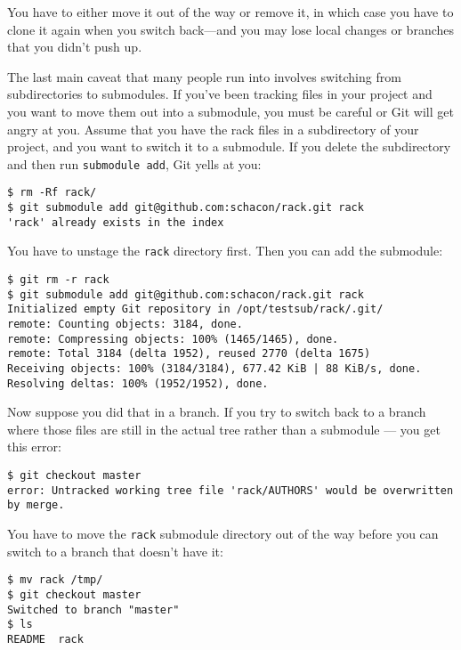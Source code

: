 \documentclass[a4paper]{book}
\begin{document}
You have to either move it out of the way or remove it, in which case you have to clone it again when you switch back---and you may lose local changes or branches that you didn't push up.

The last main caveat that many people run into involves switching from subdirectories to submodules. If you've been tracking files in your project and you want to move them out into a submodule, you must be careful or Git will get angry at you. Assume that you have the rack files in a subdirectory of your project, and you want to switch it to a submodule. If you delete the subdirectory and then run \texttt{submodule add}, Git yells at you:

\begin{shaded}\begin{verbatim}
$ rm -Rf rack/
$ git submodule add git@github.com:schacon/rack.git rack
'rack' already exists in the index
\end{verbatim}\end{shaded}

You have to unstage the \texttt{rack} directory first. Then you can add the submodule:

\begin{shaded}\begin{verbatim}
$ git rm -r rack
$ git submodule add git@github.com:schacon/rack.git rack
Initialized empty Git repository in /opt/testsub/rack/.git/
remote: Counting objects: 3184, done.
remote: Compressing objects: 100% (1465/1465), done.
remote: Total 3184 (delta 1952), reused 2770 (delta 1675)
Receiving objects: 100% (3184/3184), 677.42 KiB | 88 KiB/s, done.
Resolving deltas: 100% (1952/1952), done.
\end{verbatim}\end{shaded}

Now suppose you did that in a branch. If you try to switch back to a branch where those files are still in the actual tree rather than a submodule --- you get this error:

\begin{shaded}\begin{verbatim}
$ git checkout master
error: Untracked working tree file 'rack/AUTHORS' would be overwritten by merge.
\end{verbatim}\end{shaded}

You have to move the \texttt{rack} submodule directory out of the way before you can switch to a branch that doesn't have it:

\begin{shaded}\begin{verbatim}
$ mv rack /tmp/
$ git checkout master
Switched to branch "master"
$ ls
README	rack
\end{verbatim}\end{shaded}
\end{document}
